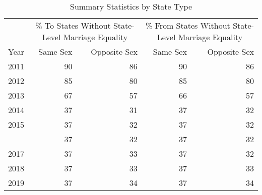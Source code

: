 \begin{table}

\caption{Summary Statistics by State Type}
\centering
\begin{tabular}[t]{rrrrr}
\toprule
\multicolumn{1}{c}{ } & \multicolumn{2}{c}{\% To States Without State-Level Marriage Equality} & \multicolumn{2}{c}{\% From States Without State-Level Marriage Equality} \\
\cmidrule(l{3pt}r{3pt}){2-3} \cmidrule(l{3pt}r{3pt}){4-5}
Year & Same-Sex & Opposite-Sex & Same-Sex & Opposite-Sex\\
\midrule
2011 & 90 & 86 & 90 & 86\\
2012 & 85 & 80 & 85 & 80\\
2013 & 67 & 57 & 66 & 57\\
2014 & 37 & 31 & 37 & 32\\
2015 & 37 & 32 & 37 & 32\\
\addlinespace
2016 & 37 & 32 & 37 & 32\\
2017 & 37 & 33 & 37 & 32\\
2018 & 37 & 33 & 37 & 33\\
2019 & 37 & 34 & 37 & 34\\
\bottomrule
\end{tabular}
\end{table}
